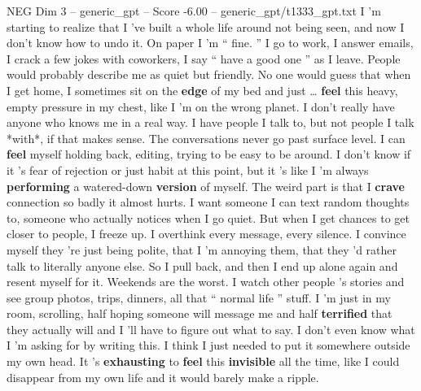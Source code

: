 \begin{textsample}{NEG Dim 3 – generic\_gpt – Score -6.00 – generic\_gpt/t1333\_gpt.txt}  \label{ex:f3_neg_012}
I ’m starting to realize that I ’ve built a whole life around not being seen, and now I don't know how to undo it.
On paper I ’m “ fine. ” I go to work, I answer emails, I crack a few jokes with coworkers, I say “ have a good one ” as I leave.
People would probably describe me as quiet but friendly.
No one would guess that when I get home, I sometimes sit on the \textbf{edge} of my bed and just … \textbf{feel} this heavy, empty pressure in my chest, like I ’m on the wrong planet.
I don't really have anyone who knows me in a real way.
I have people I talk to, but not people I talk *with*, if that makes sense.
The conversations never go past surface level.
I can \textbf{feel} myself holding back, editing, trying to be easy to be around.
I don't know if it ’s fear of rejection or just habit at this point, but it ’s like I ’m always \textbf{performing} a watered-down \textbf{version} of myself.
The weird part is that I \textbf{crave} connection so badly it almost hurts.
I want someone I can text random thoughts to, someone who actually notices when I go quiet.
But when I get chances to get closer to people, I freeze up.
I overthink every message, every silence.
I convince myself they ’re just being polite, that I ’m annoying them, that they ’d rather talk to literally anyone else.
So I pull back, and then I end up alone again and resent myself for it.
Weekends are the worst.
I watch other people ’s stories and see group photos, trips, dinners, all that “ normal life ” stuff.
I ’m just in my room, scrolling, half hoping someone will message me and half \textbf{terrified} that they actually will and I ’ll have to figure out what to say.
I don't even know what I ’m asking for by writing this.
I think I just needed to put it somewhere outside my own head.
It ’s \textbf{exhausting} to \textbf{feel} this \textbf{invisible} all the time, like I could disappear from my own life and it would barely make a ripple.

\end{textsample}
